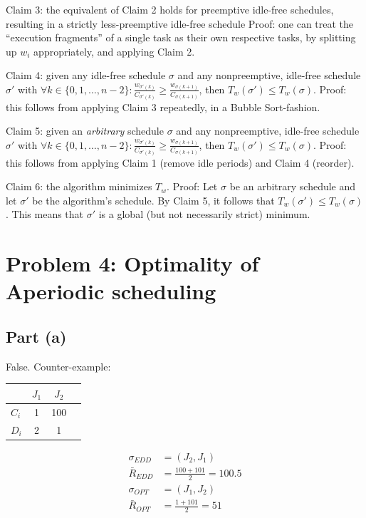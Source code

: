 \documentclass[a4paper,parskip,headheight=38pt]{scrartcl} %
\begin{document}
Claim 3: the equivalent of Claim 2 holds for preemptive idle-free
schedules, resulting in a strictly less-preemptive idle-free schedule
Proof: one can treat the \enquote{execution fragments} of a single task
as their own respective tasks, by splitting up $w_i$ appropriately, and
applying Claim 2.

Claim 4: given any idle-free schedule $\sigma$ and any nonpreemptive,
idle-free schedule $\sigma'$ with $\forall k \in \{0, 1, \ldots, n -
2\}: \frac{w_{\sigma'(k)}}{C_{\sigma'(k)}} \geq \frac{w_{\sigma(k +
1)}}{C_{\sigma(k+1)}}$, then $T_w(\sigma') \leq T_w(\sigma)$.
Proof: this follows from applying Claim 3 repeatedly, in a Bubble
Sort-fashion.

Claim 5: given an \emph{arbitrary} schedule $\sigma$ and any
nonpreemptive, idle-free schedule $\sigma'$ with $\forall k \in \{0, 1,
\ldots, n - 2\}: \frac{w_{\sigma'(k)}}{C_{\sigma'(k)}} \geq
\frac{w_{\sigma(k + 1)}}{C_{\sigma(k+1)}}$, then $T_w(\sigma') \leq
T_w(\sigma)$.
Proof: this follows from applying Claim 1 (remove idle periods) and
Claim 4 (reorder).

Claim 6: the algorithm minimizes $T_w$.
Proof: Let $\sigma$ be an arbitrary schedule and let $\sigma'$ be the
algorithm's schedule.  By Claim 5, it follows that $T_w(\sigma') \leq
T_w(\sigma)$.  This means that $\sigma'$ is a global (but not
necessarily strict) minimum.


\section*{Problem 4: Optimality of Aperiodic scheduling}

\subsection*{Part (a)}

False.  Counter-example:

\begin{tabular}{l|ccc}
      & $J_1$ & $J_2$ \\ \hline
$C_i$ &   1   &  100  \\
$D_i$ &   2   &   1   \\
\end{tabular}

\begin{align*}
    \sigma_{EDD} &= (J_2, J_1) \\
    \bar{R}_{EDD} &= \frac{100+101}{2} = 100.5 \\
    \sigma_{OPT} &= (J_1, J_2) \\
    \bar{R}_{OPT} &= \frac{1+101}{2} = 51
\end{align*}
\end{document}
